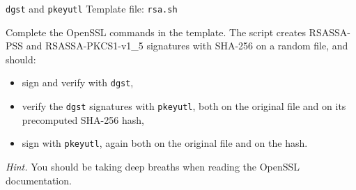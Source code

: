 \documentclass{practice}
\begin{document}
\begin{task}{\texttt{dgst} and \texttt{pkeyutl}}
  Template file: \texttt{rsa.sh}

  Complete the OpenSSL commands in the template.
  The script creates RSASSA-PSS and RSASSA-PKCS1-v1\_5 signatures with SHA-256 on a random file, and should:
  \begin{itemize}
    \item sign and verify with \texttt{dgst},
    \item verify the \texttt{dgst} signatures with \texttt{pkeyutl}, both on the original file and on its precomputed SHA-256 hash,
    \item sign with \texttt{pkeyutl}, again both on the original file and on the hash.
  \end{itemize}

  \textit{Hint.}
  You should be taking deep breaths when reading the OpenSSL documentation.
\end{task}
\end{document}
